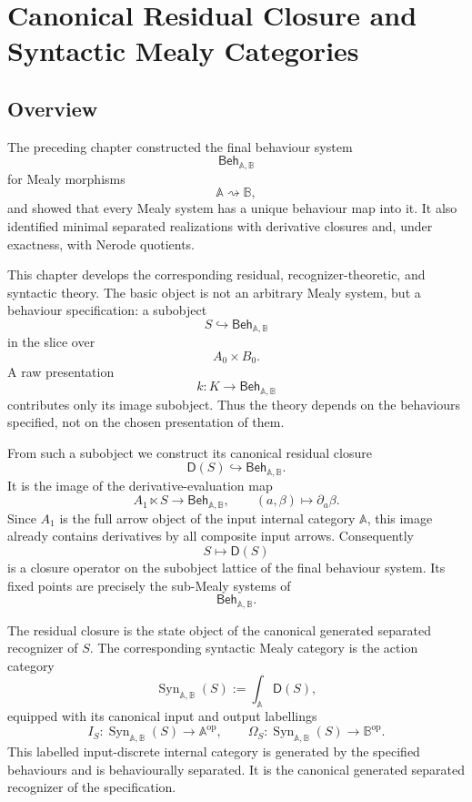 \chapter{Canonical Residual Closure and Syntactic Mealy Categories}
\label{ch:canonical-residual-closure-behaviour-specifications}

\section{Overview}
\label{sec:canonical-residual-closure-overview}

The preceding chapter constructed the final behaviour system
\[
\mathsf{Beh}_{\mathbb A,\mathbb B}
\]
for Mealy morphisms
\[
\mathbb A\rightsquigarrow\mathbb B,
\]
and showed that every Mealy system has a unique behaviour map into it. It
also identified minimal separated realizations with derivative closures and,
under exactness, with Nerode quotients.

This chapter develops the corresponding residual, recognizer-theoretic, and
syntactic theory. The basic object is not an arbitrary Mealy system, but a
behaviour specification: a subobject
\[
S\hookrightarrow \mathsf{Beh}_{\mathbb A,\mathbb B}
\]
in the slice over
\[
A_0\times B_0.
\]
A raw presentation
\[
k:K\to \mathsf{Beh}_{\mathbb A,\mathbb B}
\]
contributes only its image subobject. Thus the theory depends on the
behaviours specified, not on the chosen presentation of them.

From such a subobject we construct its canonical residual closure
\[
\mathsf D(S)\hookrightarrow \mathsf{Beh}_{\mathbb A,\mathbb B}.
\]
It is the image of the derivative-evaluation map
\[
A_1\ltimes S\to \mathsf{Beh}_{\mathbb A,\mathbb B},
\qquad
(a,\beta)\longmapsto \partial_a\beta.
\]
Since \(A_1\) is the full arrow object of the input internal category
\(\mathbb A\), this image already contains derivatives by all composite input
arrows. Consequently
\[
S\longmapsto \mathsf D(S)
\]
is a closure operator on the subobject lattice of the final behaviour system.
Its fixed points are precisely the sub-Mealy systems of
\[
\mathsf{Beh}_{\mathbb A,\mathbb B}.
\]

The residual closure is the state object of the canonical generated separated
recognizer of \(S\). The corresponding syntactic Mealy category is the action
category
\[
\operatorname{Syn}_{\mathbb A,\mathbb B}(S)
:=
\int_{\mathbb A}\mathsf D(S),
\]
equipped with its canonical input and output labellings
\[
I_S:
\operatorname{Syn}_{\mathbb A,\mathbb B}(S)
\to
\mathbb A^{\mathrm{op}},
\qquad
\Omega_S:
\operatorname{Syn}_{\mathbb A,\mathbb B}(S)
\to
\mathbb B^{\mathrm{op}}.
\]
This labelled input-discrete internal category is generated by the specified
behaviours and is behaviourally separated. It is the canonical generated
separated recognizer of the specification.

